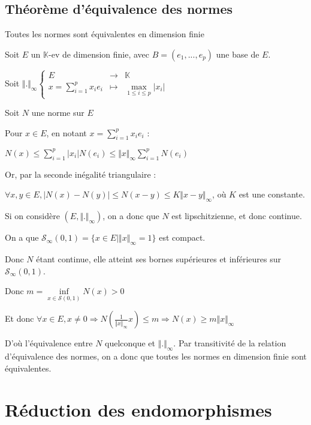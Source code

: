 \documentclass[a4paper,12pt]{book}
\newcommand{\Thr}[2]{\begin{tcolorbox}[sharp corners, colback=white,colframe=red!90!black!75, title=Théorème : #1]#2\end{tcolorbox}}
\newcommand{\Pre}[1]{\begin{tcolorbox}[sharp corners, colback=white,colframe=green!60!green!30!black!75, title=Preuve]#1\end{tcolorbox}}
\def\K{\mathbb{K}}
\begin{document}
\section{Théorème d'équivalence des normes}
\Thr{L'équivalence des normes}{Toutes les normes sont équivalentes en dimension finie}
\Pre{Soit $E$ un $\K$-ev de dimension finie, avec $B=(e_1,...,e_p)$ une base de $E$. \par Soit $\Vert.\Vert_\infty\left\{\begin{array}{rcl} E&\to&\K \\ x=\sum\limits_{i=1}^px_ie_i & \mapsto & \max\limits_{1\leq i\leq p}\vert x_i\vert \end{array}\right.$
\par Soit $N$ une norme sur $E$ \par Pour $x\in E$, en notant $x=\sum\limits_{i=1}^px_ie_i$ : \par $N(x)\leq\sum\limits_{i=1}^p\vert x_i\vert N(e_i)\leq\Vert x\Vert_\infty\sum\limits_{i=1}^p N(e_i)$ \par Or, par la seconde inégalité triangulaire : \par $\forall x,y\in E, \vert N(x)-N(y)\vert\leq N(x-y)\leq K\Vert x-y\Vert_\infty$, où $K$ est une constante. \par Si on considère $(E,\Vert.\Vert_\infty)$, on a donc que $N$ est lipschitzienne, et donc continue.
\par On a que $\mathcal{S}_\infty(0,1)=\{x\in E\vert \Vert x\Vert_\infty=1\}$ est compact. \par Donc $N$ étant continue, elle atteint ses bornes supérieures et inférieures sur $\mathcal{S}_\infty(0,1)$. \par Donc $m=\inf\limits_{x\in\mathcal{S}(0,1)}N(x)>0$ \par Et donc $\forall x\in E,x\neq 0\Rightarrow N\left(\frac{1}{\Vert x\Vert_\infty}x\right)\leq m\Rightarrow N(x)\geq m\Vert x\Vert_\infty$
\par D'où l'équivalence entre $N$ quelconque et $\Vert.\Vert_\infty$. Par transitivité de la relation d'équivalence des normes, on a donc que toutes les normes en dimension finie sont équivalentes.}



\chapter{Réduction des endomorphismes}
\end{document}
